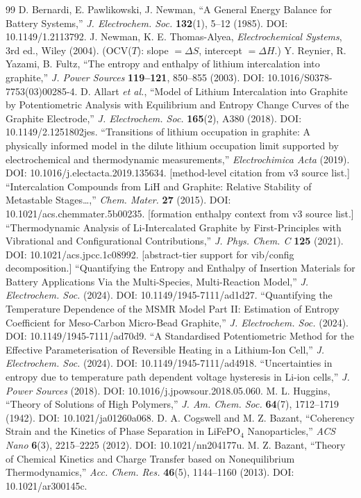 \documentclass[11pt,a4paper]{article}
\begin{document}
\begin{thebibliography}{99}
 D. Bernardi, E. Pawlikowski, J. Newman, ``A General Energy Balance for Battery Systems,'' \emph{J. Electrochem. Soc.} \textbf{132}(1), 5--12 (1985). DOI: 10.1149/1.2113792.
 J. Newman, K. E. Thomas-Alyea, \emph{Electrochemical Systems}, 3rd ed., Wiley (2004). (OCV($T$): slope $=\Delta S$, intercept $=\Delta H$.)
 Y. Reynier, R. Yazami, B. Fultz, ``The entropy and enthalpy of lithium intercalation into graphite,'' \emph{J. Power Sources} \textbf{119--121}, 850--855 (2003). DOI: 10.1016/S0378-7753(03)00285-4.
 D. Allart \emph{et al.}, ``Model of Lithium Intercalation into Graphite by Potentiometric Analysis with Equilibrium and Entropy Change Curves of the Graphite Electrode,'' \emph{J. Electrochem. Soc.} \textbf{165}(2), A380 (2018). DOI: 10.1149/2.1251802jes.
 ``Transitions of lithium occupation in graphite: A physically informed model in the dilute lithium occupation limit supported by electrochemical and thermodynamic measurements,'' \emph{Electrochimica Acta} (2019). DOI: 10.1016/j.electacta.2019.135634. [method-level citation from v3 source list.]
 ``Intercalation Compounds from LiH and Graphite: Relative Stability of Metastable Stages\ldots,'' \emph{Chem. Mater.} \textbf{27} (2015). DOI: 10.1021/acs.chemmater.5b00235. [formation enthalpy context from v3 source list.]
 ``Thermodynamic Analysis of Li-Intercalated Graphite by First-Principles with Vibrational and Configurational Contributions,'' \emph{J. Phys. Chem. C} \textbf{125} (2021). DOI: 10.1021/acs.jpcc.1c08992. [abstract-tier support for vib/config decomposition.]
 ``Quantifying the Entropy and Enthalpy of Insertion Materials for Battery Applications Via the Multi-Species, Multi-Reaction Model,'' \emph{J. Electrochem. Soc.} (2024). DOI: 10.1149/1945-7111/ad1d27.
 ``Quantifying the Temperature Dependence of the MSMR Model Part II: Estimation of Entropy Coefficient for Meso-Carbon Micro-Bead Graphite,'' \emph{J. Electrochem. Soc.} (2024). DOI: 10.1149/1945-7111/ad70d9.
 ``A Standardised Potentiometric Method for the Effective Parameterisation of Reversible Heating in a Lithium-Ion Cell,'' \emph{J. Electrochem. Soc.} (2024). DOI: 10.1149/1945-7111/ad4918.
 ``Uncertainties in entropy due to temperature path dependent voltage hysteresis in Li-ion cells,'' \emph{J. Power Sources} (2018). DOI: 10.1016/j.jpowsour.2018.05.060.
 M. L. Huggins, ``Theory of Solutions of High Polymers,'' \emph{J. Am. Chem. Soc.} \textbf{64}(7), 1712--1719 (1942). DOI: 10.1021/ja01260a068.
 D. A. Cogswell and M. Z. Bazant, ``Coherency Strain and the Kinetics of Phase Separation in LiFePO$_4$ Nanoparticles,'' \emph{ACS Nano} \textbf{6}(3), 2215--2225 (2012). DOI: 10.1021/nn204177u.
 M. Z. Bazant, ``Theory of Chemical Kinetics and Charge Transfer based on Nonequilibrium Thermodynamics,'' \emph{Acc. Chem. Res.} \textbf{46}(5), 1144--1160 (2013). DOI: 10.1021/ar300145c.
\end{thebibliography}
\end{document}
